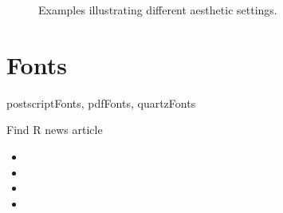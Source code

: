 \begin{figure}[htbp]
{  }
  \caption{Examples illustrating different aesthetic settings.}
\end{figure}

\section{Fonts}
\label{sec:fonts}

postscriptFonts, pdfFonts, quartzFonts

Find R news article

\begin{itemize}
  \item {}
  \item {}
  \item {}
  \item {}
\end{itemize}




